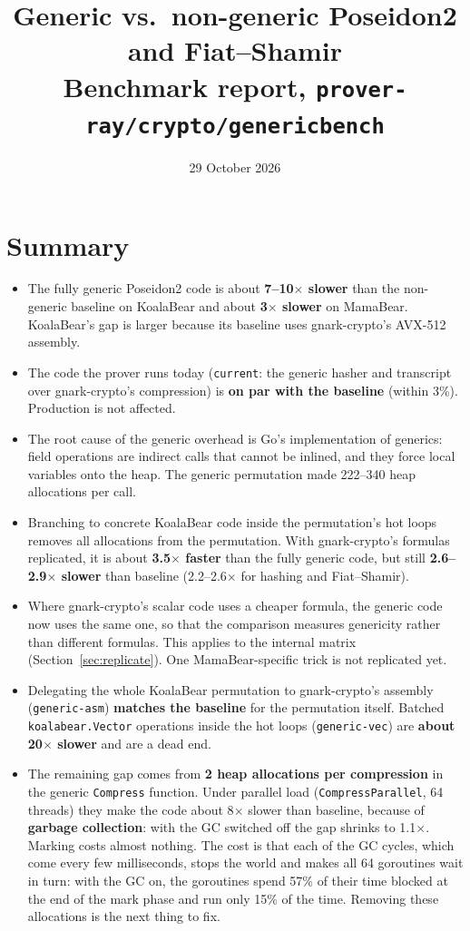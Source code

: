 \documentclass[10pt,a4paper]{article}
\title{Generic vs.\ non-generic Poseidon2 and Fiat--Shamir\\\large Benchmark report, \texttt{prover-ray/crypto/genericbench}}
\author{}
\date{29 October 2026}
\begin{document}
\maketitle
\vspace{-2em}

\section{Summary}

\begin{itemize}
  \item The fully generic Poseidon2 code is about \textbf{7--10$\times$ slower} than the
    non-generic baseline on KoalaBear and about \textbf{3$\times$ slower} on MamaBear.
    KoalaBear's gap is larger because its baseline uses gnark-crypto's AVX-512 assembly.
  \item The code the prover runs today (\texttt{current}: the generic hasher and transcript
    over gnark-crypto's compression) is \textbf{on par with the baseline} (within 3\%).
    Production is not affected.
  \item The root cause of the generic overhead is Go's implementation of generics: field
    operations are indirect calls that cannot be inlined, and they force local variables onto
    the heap. The generic permutation made 222--340 heap allocations per call.
  \item Branching to concrete KoalaBear code inside the permutation's hot loops removes all
    allocations from the permutation. With gnark-crypto's formulas replicated, it is about
    \textbf{3.5$\times$ faster} than the fully generic code, but still
    \textbf{2.6--2.9$\times$ slower} than baseline (2.2--2.6$\times$ for hashing and
    Fiat--Shamir).
  \item Where gnark-crypto's scalar code uses a cheaper formula, the generic code now uses
    the same one, so that the comparison measures genericity rather than different
    formulas. This applies to the internal matrix (Section~\ref{sec:replicate}). One
    MamaBear-specific trick is not replicated yet.
  \item Delegating the whole KoalaBear permutation to gnark-crypto's assembly
    (\texttt{generic-asm}) \textbf{matches the baseline} for the permutation itself.
    Batched \texttt{koalabear.Vector} operations inside the hot loops
    (\texttt{generic-vec}) are \textbf{about 20$\times$ slower} and are a dead end.
  \item The remaining gap comes from \textbf{2 heap allocations per compression} in the
    generic \texttt{Compress} function. Under parallel load (\texttt{CompressParallel},
    64 threads) they make the code about 8$\times$ slower than baseline, because of
    \textbf{garbage collection}: with the GC switched off the gap shrinks to 1.1$\times$.
    Marking costs almost nothing. The cost is that each of the GC cycles, which come every
    few milliseconds, stops the world and makes all 64 goroutines wait in turn: with the GC
    on, the goroutines spend 57\% of their time blocked at the end of the mark phase and run
    only 15\% of the time.
    Removing these allocations is the next thing to fix.
\end{itemize}
\end{document}
